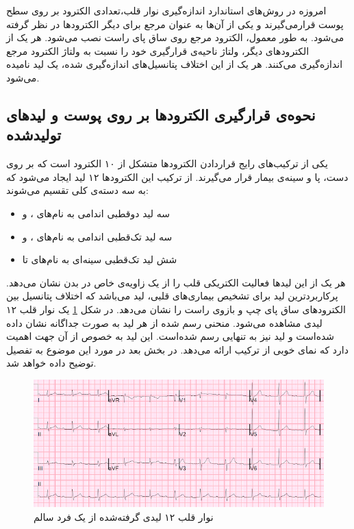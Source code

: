 امروزه در روش‌های استاندارد اندازه‌گیری نوار قلب،تعدادی الکترود بر روی سطح پوست قرارمی‌گیرند و یکی از آن‌ها به عنوان مرجع  برای دیگر الکترودها در نظر گرفته می‌شود. به طور معمول، الکترود مرجع روی ساق پای راست نصب می‌شود. \cite{ECGSurvey} هر یک از الکترودهای دیگر، ولتاژ ناحیه‌ی قرارگیری خود را نسبت به ولتاژ الکترود مرجع اندازه‌گیری می‌کنند. هر یک از این اختلاف پتانسیل‌های اندازه‌گیری شده، یک لید  نامیده می‌شود. 
\subsection{نحوه‌ی قرارگیری الکترودها بر روی پوست و لیدهای تولیدشده}

یکی از ترکیب‌های رایج قراردادن الکترودها متشکل از ۱۰ الکترود است که بر روی دست، پا و سینه‌ی بیمار قرار می‌گیرند. از ترکیب این الکترودها ۱۲ لید ایجاد می‌شود که به سه دسته‌ی کلی تقسیم می‌شوند:
\begin{itemize}
	\item  سه لید دوقطبی اندامی  به نام‌های ،  و 
	\item سه لید تک‌قطبی اندامی  به نام‌های ،  و 
	\item شش لید تک‌قطبی سینه‌ای به نام‌های  تا 
\end{itemize}
  هر یک از این لیدها فعالیت الکتریکی قلب را از یک زاویه‌ی خاص در بدن نشان می‌دهد. پرکاربردترین لید برای تشخیص بیماری‌های قلبی، لید  می‌باشد که اختلاف پتانسیل بین الکترودهای ساق پای چپ و بازوی راست را نشان می‌دهد. در شکل \ref{fig:leads} یک نوار قلب ۱۲ لیدی مشاهده می‌شود. منحنی رسم شده از هر لید به صورت جداگانه نشان داده شده‌است و لید  نیز به تنهایی رسم شده‌است. این لید به خصوص از آن جهت اهمیت دارد که نمای خوبی از ترکیب 
ارائه می‌دهد. در بخش بعد در مورد این موضوع به تفصیل توضیح داده خواهد شد.
\begin{figure}
\centering
\includegraphics[width=16cm]{Figures/leads.png}
\caption{نوار قلب ۱۲ لیدی گرفته‌شده از یک فرد سالم\cite{Drsmith}}
\label{fig:leads}
\end{figure}


